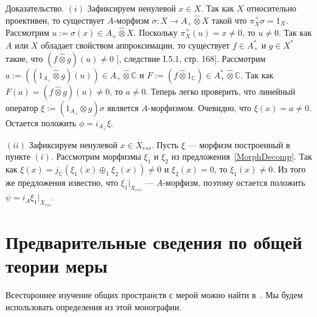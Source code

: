\documentclass[12pt]{article}
\numberwithin{equation}{subsection}
\theoremstyle{plain}
\newenvironment{proof}{Доказательство.}{}
\newcommand{\projtens}{\mathbin{\widehat{\otimes}}}
\begin{document}
\begin{fulltext}
\begin{proof}
        $(i)$ Зафиксируем ненулевой $x\in X$. Так как $X$ относительно
        проективен, то существует $A$-морфизм $\sigma:X\to A_+\projtens X$ такой
        что $\pi_X^+\sigma=1_X$. Рассмотрим $u:=\sigma(x)\in A_+\projtens X$.
        Поскольку $\pi_X^+(u)=x\neq 0$, то $u\neq 0$. Так как $A$ или $X$
        обладает свойством аппроксимации, то существует $f\in A_+^*$ и
        $g\in X^*$ такие, что $(f\projtens g)(u)\neq 0$
        [\cite{GrothProdTenTopNucl}, следствие I.5.1, стр. 168].
        Рассмотрим $a:=((1_{A_+}\projtens g)(u))\in A_+\projtens\mathbb{C}$ и
        $F:=(f\projtens 1_{\mathbb{C}})\in A_+^*\projtens\mathbb{C}$.
        Так как $F(a)=(f\projtens g)(u)\neq 0$, то
        $a\neq 0$. Теперь легко проверить, что линейный оператор
        $\xi:=(1_{A_+}\projtens g)\sigma$ является $A$-морфизмом. Очевидно, что
        $\xi(x)=a\neq 0$. Остается положить $\phi=i_{A_+}\xi$.

        $(ii)$ Зафиксируем ненулевой $x\in X_{ess}$. Пусть $\xi$ --- морфизм
        построенный в пункте $(i)$. Рассмотрим морфизмы $\xi_1$ и $\xi_2$ из
        предложения~\ref{MorphDecomp}. Так как
        $\xi(x)=j_{\mathbb{C}}(\xi_1(x)\oplus_1\xi_2(x))\neq 0$ и $\xi_2(x)=0$,
        то $\xi_1(x)\neq 0$. Из того же предложения известно, что
        $\xi_1|_{X_{ess}}$ --- $A$-морфизм, поэтому остается положить $\psi=i_A
            \xi_1|_{X_{ess}}$.

    \end{proof}


    \section{Предварительные сведения по общей теории
      меры}\label{SectionPreliminariesOnGeneralMeasureTheory}

    Всестороннее изучение общих пространств с мерой можно найти
    в~\cite{FremMeasTh2}. Мы будем использовать определения из этой монографии.


\end{fulltext}
\end{document}
